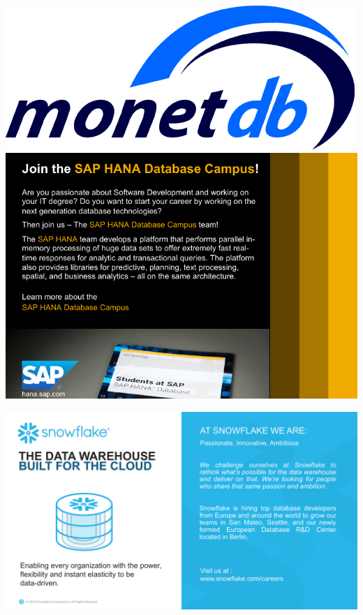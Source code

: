 \includegraphics[height=.49\textheight,width=\textwidth,keepaspectratio]{ads/monetdb.png}
\vfill
\includegraphics[height=.49\textheight,width=\textwidth,keepaspectratio]{ads/sap.pdf}
\pagebreak

\includegraphics[height=.49\textheight,width=\textwidth,keepaspectratio]{ads/snowflake.pdf}
\vfill
\pagebreak


